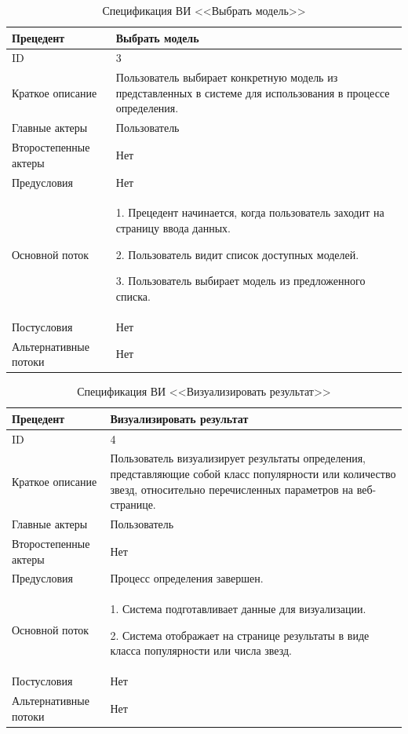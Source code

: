 \begin{table}[H]
    \caption{Спецификация ВИ <<Выбрать модель>>}
    \fontsize{12pt}{1em}\selectfont
    \vspace{1em}
    \begin{tabularx}{\linewidth}{|l|X|}
       \hline
        Прецедент & Выбрать модель \\ \hline
        ID & 3\\ \hline
        Краткое описание & Пользователь выбирает конкретную модель из представленных в системе для использования в процессе определения. \\ \hline
        Главные актеры & Пользователь\\ \hline
        Второстепенные актеры & Нет \\ \hline
        Предусловия & Нет  \\ \hline
        Основной поток & 
        1. Прецедент начинается, когда пользователь заходит на страницу ввода данных. 
        
        2. Пользователь видит список доступных моделей.
        
        3. Пользователь выбирает модель из предложенного списка.\\
    \hline
        Постусловия & Нет \\ \hline
        Альтернативные потоки & Нет \\ \hline
        \end{tabularx} 
    \label{tab:модель}
\end{table}
\vspace{1em}

\begin{table}[H]
    \caption{Спецификация ВИ <<Визуализировать результат>>}
    \fontsize{12pt}{1em}\selectfont
    \vspace{1em}
    \begin{tabularx}{\linewidth}{|l|X|}
       \hline
        Прецедент & Визуализировать результат  \\ \hline
        ID & 4\\ \hline
        Краткое описание & Пользователь визуализирует результаты определения, представляющие собой класс популярности или количество звезд, относительно перечисленных параметров на веб-странице. \\ \hline
        Главные актеры & Пользователь\\ \hline
        Второстепенные актеры & Нет \\ \hline
        Предусловия & Процесс определения завершен. \\ \hline
        Основной поток & 
        1. Система подготавливает данные для визуализации. 
        
        2. Система отображает на странице результаты в виде класса популярности или числа звезд.\\
    \hline
        Постусловия & Нет \\ \hline
        Альтернативные потоки & Нет \\ \hline
        \end{tabularx} 
    \label{tab:модель}
\end{table}
\vspace{2em}

